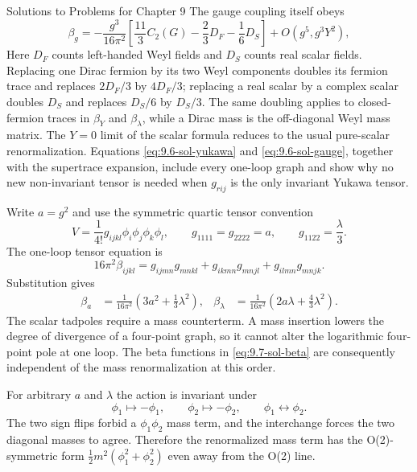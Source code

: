 \begin{bankssolutions}{Solutions to Problems for Chapter 9}
The gauge coupling itself obeys
\begin{equation}
 \beta_g=-\frac{g^3}{16\pi^2}\left[
 \frac{11}{3}C_2(G)-\frac{2}{3}D_F-\frac{1}{6}D_S\right]
 +O(g^5,g^3Y^2),
 \label{eq:9.6-sol-gauge}
\end{equation}
Here $D_F$ counts left-handed Weyl fields and $D_S$ counts real scalar
fields.  Replacing one Dirac fermion by its two Weyl components doubles its
fermion trace and replaces $2D_F/3$ by $4D_F/3$; replacing a real scalar by a
complex scalar doubles $D_S$ and replaces $D_S/6$ by $D_S/3$.  The same
doubling applies to closed-fermion traces in $\beta_Y$ and
$\beta_\lambda$, while a Dirac mass is the off-diagonal Weyl mass matrix.
The $Y=0$ limit of the scalar formula reduces to the usual pure-scalar
renormalization.  Equations \eqref{eq:9.6-sol-yukawa} and
\eqref{eq:9.6-sol-gauge}, together with the supertrace expansion, include
every one-loop graph and show why no new non-invariant tensor is needed when
$g_{rij}$ is the only invariant Yukawa tensor.

Write $a=g^2$ and use the symmetric quartic tensor convention
\[
 V=\frac1{4!}g_{ijkl}\phi_i\phi_j\phi_k\phi_l,
 \qquad g_{1111}=g_{2222}=a,
 \qquad g_{1122}=\frac{\lambda}{3}.
\]
The one-loop tensor equation is
\[
 16\pi^2\beta_{ijkl}=
 g_{ijmn}g_{mnkl}+g_{ikmn}g_{mnjl}+g_{ilmn}g_{mnjk}.
\]
Substitution gives
\begin{align}
 \beta_a&=\frac{1}{16\pi^2}\left(3a^2+\frac13\lambda^2\right),
 &\beta_\lambda&=\frac{1}{16\pi^2}\left(2a\lambda+\frac43\lambda^2\right).
 \label{eq:9.7-sol-beta}
\end{align}
The scalar tadpoles require a mass counterterm.  A mass insertion lowers the
degree of divergence of a four-point graph, so it cannot alter the
logarithmic four-point pole at one loop.  The beta functions in
\eqref{eq:9.7-sol-beta} are consequently independent of the mass
renormalization at this order.

For arbitrary $a$ and $\lambda$ the action is invariant under
\[
 \phi_1\mapsto-\phi_1,
 \qquad \phi_2\mapsto-\phi_2,
 \qquad \phi_1\leftrightarrow\phi_2.
\]
The two sign flips forbid a $\phi_1\phi_2$ mass term, and the interchange
forces the two diagonal masses to agree.  Therefore the renormalized mass
term has the O(2)-symmetric form
$\frac12m^2(\phi_1^2+\phi_2^2)$ even away from the O(2) line.


\end{bankssolutions}
